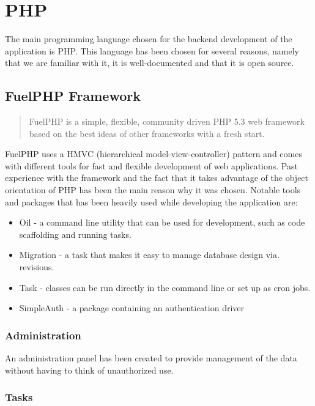 \section{PHP}

The main programming language chosen for the backend development of the application is PHP. This language has been chosen for several reasons, namely that we are familiar with it, it is well-documented and that it is open source.

\subsection{FuelPHP Framework}

\begin{quote}
FuelPHP is a simple, flexible, community driven PHP 5.3 web framework based on the best ideas of other frameworks with a fresh start.
\end{quote}
\cite{FuelPHP}

FuelPHP uses a HMVC (hierarchical model-view-controller) pattern and comes with different tools for fast and flexible development of web applications. Past experience with the framework and the fact that it takes advantage of the object orientation of PHP has been the main reason why it was chosen. Notable tools and packages that has been heavily used while developing the application are:

\begin{itemize}
\item Oil - a command line utility that can be used for development, such as code scaffolding and running tasks. 
\item Migration - a task that makes it easy to manage database design via. revisions.
\item Task - classes can be run directly in the command line or set up as cron jobs.
\item SimpleAuth - a package containing an authentication driver
\end{itemize}

\subsubsection{Administration}

An administration panel has been created to provide management of the data without having to think of unauthorized use. 

\subsubsection{Tasks}

